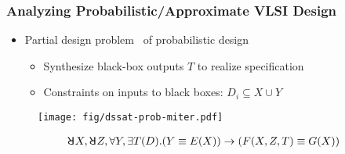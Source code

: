 \begin{frame}
  \frametitle{Analyzing Probabilistic/Approximate VLSI Design}
  \begin{itemize}
    \item Partial design problem~\cite{Gitina2013} of probabilistic design
          \pause
          \begin{itemize}
            \item Synthesize black-box outputs $T$ to realize specification
                  \pause
            \item \alert{Constraints on inputs} to black boxes: $D_i \subseteq X \cup Y$
          \end{itemize}
  \end{itemize}
  \pause
  \begin{figure}
    \centering
    \texttt{[image: fig/dssat-prob-miter.pdf]}
  \end{figure}
  \pause
  \begin{align*}
    \random{} X,\random{} Z,\forall Y,\exists T(D).
    (Y \equiv E(X)) \limply (F(X,Z,T) \equiv G(X))
  \end{align*}
\end{frame}